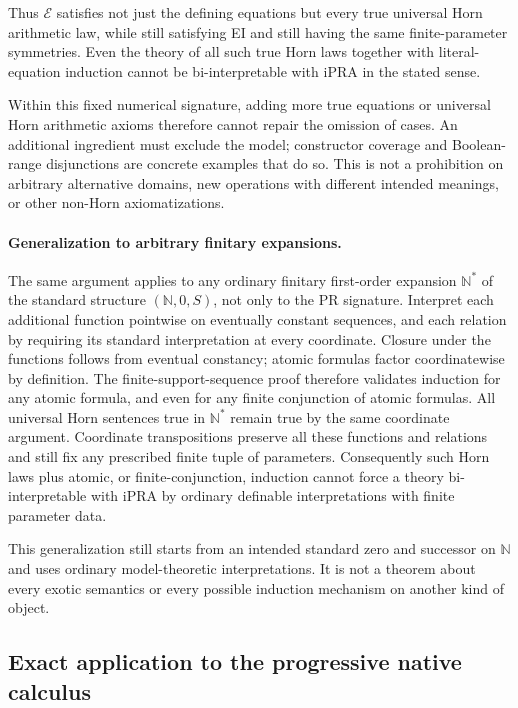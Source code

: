 Thus $\mathcal E$ satisfies not just the defining equations but every
true universal Horn arithmetic law, while still satisfying EI and
still having the same finite-parameter symmetries.  Even the theory
of all such true Horn laws together with literal-equation induction
cannot be bi-interpretable with iPRA in the stated sense.

Within this fixed numerical signature, adding more true equations
or universal Horn arithmetic axioms therefore cannot repair the
omission of cases.  An additional ingredient must exclude the model;
constructor coverage and Boolean-range disjunctions are concrete
examples that do so.  This is not a prohibition on arbitrary alternative
domains, new operations with different intended meanings, or other
non-Horn axiomatizations.

\paragraph{Generalization to arbitrary finitary expansions.}
The same argument applies to any ordinary finitary first-order expansion
$\mathbb N^*$ of the standard structure $(\mathbb N,0,S)$, not only
to the PR signature.  Interpret each additional function pointwise on
eventually constant sequences, and each relation by requiring its
standard interpretation at every coordinate.  Closure under the
functions follows from eventual constancy; atomic formulas factor
coordinatewise by definition.  The finite-support-sequence proof
therefore validates induction for any atomic formula, and even for
any finite conjunction of atomic formulas.  All universal Horn
sentences true in $\mathbb N^*$ remain true by the same coordinate
argument.  Coordinate transpositions preserve all these functions and
relations and still fix any prescribed finite tuple of parameters.
Consequently such Horn laws plus atomic, or finite-conjunction,
induction cannot force a theory bi-interpretable with iPRA by ordinary
definable interpretations with finite parameter data.

This generalization still starts from an intended standard zero and
successor on $\mathbb N$ and uses ordinary model-theoretic
interpretations.  It is not a theorem about every exotic semantics
or every possible induction mechanism on another kind of object.

\subsection{Exact application to the progressive native calculus}

